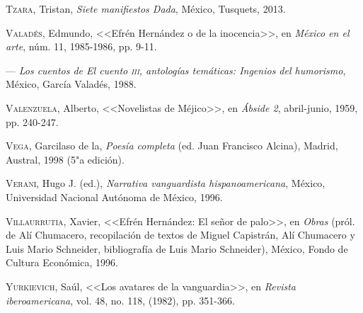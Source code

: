 \documentclass[14pt,twoside,final]{extbook} %
\begin{document}
\textsc{Tzara}, Tristan, \emph{Siete manifiestos Dada}, México, Tusquets, 2013.\label{bib:tzara2013}

\textsc{Valadés}, Edmundo, <<Efrén Hernández o de la inocencia>>, en \emph{México en el arte}, núm. 11, 1985-1986, pp. 9-11.\label{bib:valades1985}

--- \emph{Los cuentos de \emph{El cuento} \textsc{iii}, antologías temáticas: Ingenios del humorismo}, México, García Valadés, 1988.\label{bib:valades1988}

\textsc{Valenzuela}, Alberto, <<Novelistas de Méjico>>, en \emph{Ábside 2}, abril-junio, 1959, pp. 240-247.\label{bib:valenzuela1959}

\textsc{Vega}, Garcilaso de la, \emph{Poesía completa} (ed. Juan Francisco Alcina), Madrid, Austral, 1998 (5"a edición).\label{bib:vega1998}

\textsc{Verani}, Hugo J. (ed.), \emph{Narrativa vanguardista hispanoamericana}, México, Universidad Nacional Autónoma de México, 1996.\label{bib:verani1996}

\textsc{Villaurrutia}, Xavier, <<Efrén Hernández: El señor de palo>>, en \emph{Obras} (pról. de Alí Chumacero, recopilación de textos de Miguel Capistrán, Alí Chumacero y Luis Mario Schneider, bibliografía de Luis Mario Schneider), México, Fondo de Cultura Económica, 1996.\label{bib:villaurrutia1996}

\textsc{Yurkievich}, Saúl, <<Los avatares de la vanguardia>>, en \emph{Revista iberoamericana}, vol. 48, no. 118, (1982), pp. 351-366.\label{bib:yurkievich1982}
\end{document}
